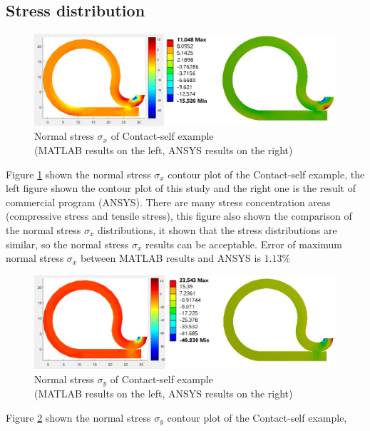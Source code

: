 \subsection{Stress distribution}
\begin{figure}[H]
    \centering
    \includegraphics[scale=0.55]{Figures/sx_self_MandA.jpg}
    \decoRule
    \caption{Normal stress $\sigma_x$ of Contact-self example \\(MATLAB results on the left, ANSYS results on the right)}
    \label{fig:sx_self_MandA}
\end{figure} \noindent
Figure \ref{fig:sx_self_MandA} shown the normal stress $\sigma_x$ contour plot of the Contact-self example,
the left figure shown the contour plot of this study and the right one is the result of
commercial program (ANSYS). There are many stress concentration areas (compressive
stress and tensile stress), this figure also shown the comparison of the normal stress $\sigma_x$
distributions, it shown that the stress distributions are similar, 
so the normal stress $\sigma_x$ results can be acceptable.
Error of maximum normal stress $\sigma_x$ between MATLAB results and ANSYS is $1.13\%$
\\
\begin{figure}[H]
    \centering
    \includegraphics[scale=0.5]{Figures/sy_self_MandA.jpg}
    \decoRule
    \caption{Normal stress $\sigma_y$ of Contact-self example \\(MATLAB results on the left, ANSYS results on the right)}
    \label{fig:sy_self_MandA}
\end{figure} \noindent
Figure \ref{fig:sy_self_MandA} shown the normal stress $\sigma_y$ contour plot of the Contact-self example, 
